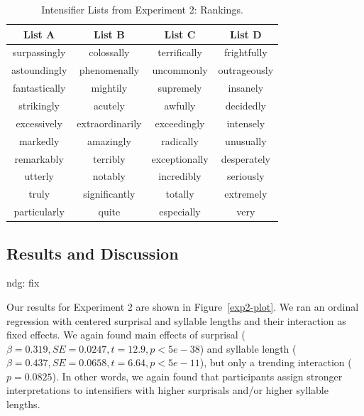 \documentclass[10pt,letterpaper]{article}
\newcommand{\todo}[1]{{\color{red}#1}}
\begin{document}
\begin{table}[ht]
\begin{center} 
\footnotesize
\caption{Intensifier Lists from Experiment 2: Rankings.} 
\label{exp2-intensifiers} 
\vskip 0.12in
\begin{tabular}{cccc} 
\hline
List A    &  List B & List C & List D \\
\hline
surpassingly & colossally & terrifically & frightfully \\
astoundingly & phenomenally & uncommonly & outrageously \\
fantastically & mightily & supremely & insanely \\
strikingly & acutely & awfully & decidedly \\
excessively & extraordinarily & exceedingly & intensely \\
markedly & amazingly & radically & unusually \\
remarkably & terribly & exceptionally & desperately \\
utterly & notably & incredibly & seriously \\
truly & significantly & totally & extremely \\
particularly & quite & especially & very
\end{tabular}
\end{center}
\end{table}

\subsection{Results and Discussion}

\todo{ndg: fix}


Our results for Experiment 2 are shown in Figure~\ref{exp2-plot}. We ran an ordinal
regression with centered surprisal and syllable lengths and their interaction as fixed effects.
We again found main effects of surprisal ($\beta=0.319, SE=0.0247, t=12.9, p<5e-38$) and syllable length ($\beta=0.437, SE=0.0658, t=6.64, p<5e-11$), but only a trending interaction ($p=0.0825$).
In other words, we again found that participants assign stronger interpretations to intensifiers with higher surprisals and/or higher syllable lengths.
\end{document}
